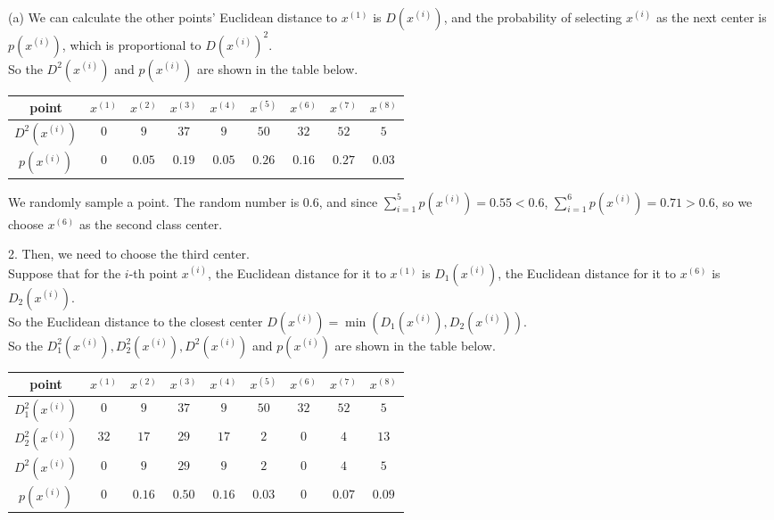 (a) We can calculate the other points' Euclidean distance to $x^{(1)}$ is $D\left(x^{(i)}\right)$, and the probability of selecting $x^{(i)}$ as the next center is $p\left(x^{(i)}\right)$, which is proportional to $D\left(x^{(i)}\right)^2$. \\
So the $D^2\left(x^{(i)}\right)$ and $p\left(x^{(i)}\right)$ are shown in the table below.
\begin{table*}[h]
    \centering
    \begin{tabular}{|c|c|c|c|c|c|c|c|c|}
	\hline
	point & $x^{(1)}$ & $x^{(2)}$ & $x^{(3)}$ & $x^{(4)}$ & $x^{(5)}$ & $x^{(6)}$ & $x^{(7)}$ & $x^{(8)}$ \\
	\hline
	$D^2\left(x^{(i)}\right)$ & $0$ & $9$ & $37$ & $9$ & $50$ & $32$ & $52$ & $5$ \\
	\hline
	$p\left(x^{(i)}\right)$ & $0$ & $0.05$ & $0.19$ & $0.05$ & $0.26$ & $0.16$ & $0.27$ & $0.03$ \\
	\hline
    \end{tabular}
\end{table*}

We randomly sample a point. The random number is $0.6$, and since $\sum\limits_{i=1}^5 p\left(x^{(i)}\right)=0.55<0.6$, $\sum\limits_{i=1}^6 p\left(x^{(i)}\right)=0.71>0.6$, so we choose $x^{(6)}$ as the second class center.

2. Then, we need to choose the third center. \\
Suppose that for the $i$-th point $x^{(i)}$, the Euclidean distance for it to $x^{(1)}$ is $D_1\left(x^{(i)}\right)$,
the Euclidean distance for it to $x^{(6)}$ is $D_2\left(x^{(i)}\right)$. \\
So the Euclidean distance to the closest center $D\left(x^{(i)}\right)=\min\left(D_1\left(x^{(i)}\right),D_2\left(x^{(i)}\right)\right)$. \\
So the $D_1^2\left(x^{(i)}\right),D_2^2\left(x^{(i)}\right),D^2\left(x^{(i)}\right)$ and $p\left(x^{(i)}\right)$ are shown in the table below.
\begin{table*}[h]
    \centering
    \begin{tabular}{|c|c|c|c|c|c|c|c|c|}
        \hline
        point & $x^{(1)}$ & $x^{(2)}$ & $x^{(3)}$ & $x^{(4)}$ & $x^{(5)}$ & $x^{(6)}$ & $x^{(7)}$ & $x^{(8)}$ \\
        \hline
        $D_1^2\left(x^{(i)}\right)$ & $0$ & $9$ & $37$ & $9$ & $50$ & $32$ & $52$ & $5$ \\
        \hline
        $D_2^2\left(x^{(i)}\right)$ & $32$ & $17$ & $29$ & $17$ & $2$ & $0$ & $4$ & $13$ \\
        \hline
        $D^2\left(x^{(i)}\right)$ & $0$ & $9$ & $29$ & $9$ & $2$ & $0$ & $4$ & $5$ \\
        \hline
        $p\left(x^{(i)}\right)$ & $0$ & $0.16$ & $0.50$ & $0.16$ & $0.03$ & $0$ & $0.07$ & $0.09$ \\
        \hline
    \end{tabular}
\end{table*}

